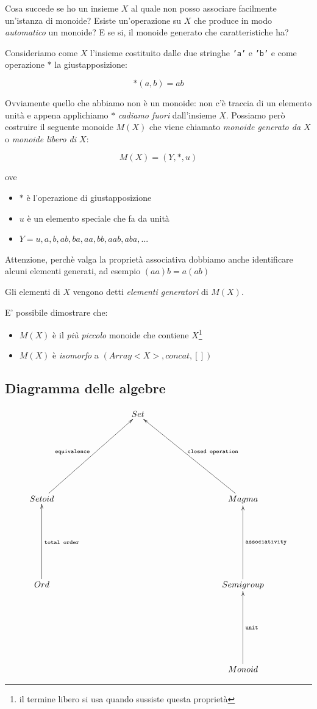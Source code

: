 \documentclass[12pt]{article}
\begin{document}
Cosa succede se ho un insieme $X$ al quale non posso associare facilmente un'istanza di monoide?
Esiste un'operazione su $X$ che produce in modo \emph{automatico} un monoide?
E se si, il monoide generato che caratteristiche ha?

Consideriamo come $X$ l'insieme costituito dalle due stringhe \texttt{'a'} e \texttt{'b'} e come operazione $*$ la giustapposizione:

$$
*(a, b) = ab
$$

Ovviamente quello che abbiamo non è un monoide: non c'è traccia di un elemento unità e appena applichiamo $*$ \emph{cadiamo fuori}
dall'insieme $X$. Possiamo però costruire il seguente monoide $M(X)$ che viene chiamato \emph{monoide generato da $X$} o \emph{monoide libero di $X$}:

$$
M(X) = (Y, *, u)
$$

ove

\begin{itemize}
  \item $*$ è l'operazione di giustapposizione
  \item $u$ è un elemento speciale che fa da unità
  \item $Y = { u, a, b, ab, ba, aa, bb, aab, aba, ... }$
\end{itemize}

Attenzione, perchè valga la proprietà associativa dobbiamo anche identificare alcuni elementi generati, ad esempio $(aa)b = a(ab)$

Gli elementi di $X$ vengono detti \emph{elementi generatori} di $M(X)$.

E' possibile dimostrare che:

\begin{itemize}
  \item $M(X)$ è il \emph{più piccolo} monoide che contiene $X$\footnote{il termine libero si usa quando sussiste questa proprietà}
  \item $M(X)$ è \emph{isomorfo} a $(Array<X>, concat, [])$
\end{itemize}

\subsection{Diagramma delle algebre}

\[
\xymatrixrowsep{3cm}
\xymatrixcolsep{3cm}
\xymatrix{
  & Set \\
  Setoid \ar[ur]^{\texttt{equivalence}} & & Magma \ar[ul]_{\texttt{closed operation}} \\
  Ord \ar[u]_{\texttt{total order}} & & Semigroup \ar[u]_{\texttt{associativity}} \\
  & & Monoid \ar[u]_{\texttt{unit}} \\
}
\]
\end{document}
